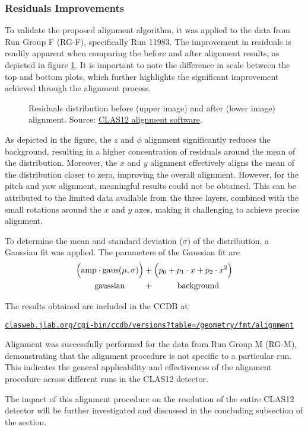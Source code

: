 \subsubsection{Residuals Improvements}
\label{sssec::residuals_improvements}
    To validate the proposed alignment algorithm, it was applied to the data from Run Group F (RG-F), specifically Run 11983.
    The improvement in residuals is readily apparent when comparing the before and after alignment results, as depicted in figure \ref{fig::res_comparison}.
    It is important to note the difference in scale between the top and bottom plots, which further highlights the significant improvement achieved through the alignment process.

    \begin{figure}[t!]
        \centering{}
        \caption[Residuals distribution improvement.]{Residuals distribution before (upper image) and after (lower image) alignment.
        Source: \hyperlink{github.com/JeffersonLab/clas12alignment}{CLAS12 alignment software}.}
        \label{fig::res_comparison}
    \end{figure}

    As depicted in the figure, the $z$ and $\phi$ alignment significantly reduces the background, resulting in a higher concentration of residuals around the mean of the distribution.
    Moreover, the $x$ and $y$ alignment effectively aligns the mean of the distribution closer to zero, improving the overall alignment.
    However, for the pitch and yaw alignment, meaningful results could not be obtained.
    This can be attributed to the limited data available from the three layers, combined with the small rotations around the $x$ and $y$ axes, making it challenging to achieve precise alignment.

    To determine the mean and standard deviation ($\sigma$) of the distribution, a Gaussian fit was applied. The parameters of the Gaussian fit are
     \begin{align*}
        \Big( \text{amp} \cdot \text{gaus}(\mu, \sigma) \Big) &+ \Big( p_0 + p_1\cdot x + p_2\cdot x^2 \Big) \\
        \text{gaussian} \hspace{0.8cm} &+ \hspace{1cm} \text{background}
    \end{align*}

    The results obtained are included in the CCDB at:

    \small\href{clasweb.jlab.org/cgi-bin/ccdb/versions?table=/geometry/fmt/alignment}{\texttt{clasweb.jlab.org/cgi-bin/ccdb/versions?table=/geometry/fmt/alignment}}

    Alignment was successfully performed for the data from Run Group M (RG-M), demonstrating that the alignment procedure is not specific to a particular run.
    This indicates the general applicability and effectiveness of the alignment procedure across different runs in the CLAS12 detector.

    The impact of this alignment procedure on the resolution of the entire CLAS12 detector will be further investigated and discussed in the concluding subsection of the section.
